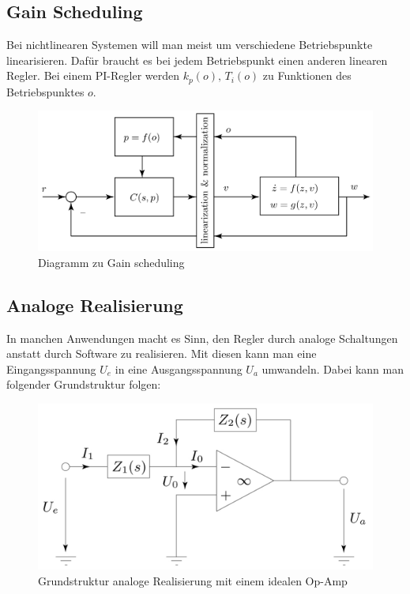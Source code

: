 \subsection{Gain Scheduling}
    Bei nichtlinearen Systemen will man meist um verschiedene Betriebspunkte linearisieren. Dafür braucht es bei jedem Betriebspunkt einen anderen linearen Regler. Bei einem PI-Regler werden $k_p(o),\, T_i(o)$ zu Funktionen des Betriebspunktes $o$.
    
    \begin{figure}[H]
        \centering
        \includegraphics[width = 0.8\linewidth]{images/04/gain_sched.jpeg}
        \caption{Diagramm zu Gain scheduling}
    \end{figure}
    
\subsection{Analoge Realisierung}
    In manchen Anwendungen macht es Sinn, den Regler durch analoge Schaltungen anstatt durch Software zu realisieren. Mit diesen kann man eine Eingangsspannung $U_e$ in eine Ausgangsspannung $U_a$ umwandeln. Dabei kann man folgender Grundstruktur folgen:
    
    \begin{figure}[H]
        \centering
        \includegraphics[width = 0.8\linewidth]{images/04/analog_real.jpeg}
        \caption{Grundstruktur analoge Realisierung mit einem idealen Op-Amp}
    \end{figure}
    
